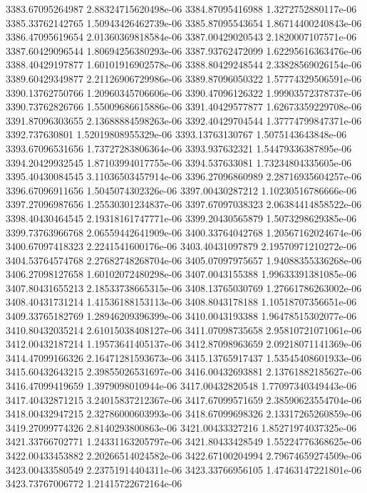 {3383.67095264987 2.88324715620498e-06
3384.87095416988 1.3272752880117e-06
3385.33762142765 1.50943426462739e-06
3385.87095543654 1.86714400240843e-06
3386.47095619654 2.01360369818584e-06
3387.00429020543 2.1820007107571e-06
3387.60429096544 1.80694256380293e-06
3387.93762472099 1.62295616363476e-06
3388.40429197877 1.60101916902578e-06
3388.80429248544 2.33828569026154e-06
3389.60429349877 2.21126906729986e-06
3389.87096050322 1.57774329506591e-06
3390.13762750766 1.20960345706606e-06
3390.47096126322 1.99903572378737e-06
3390.73762826766 1.55009686615886e-06
3391.40429577877 1.62673359229708e-06
3391.87096303655 2.13688884598263e-06
3392.40429704544 1.37774799847371e-06
3392.737630801 1.52019808955329e-06
3393.13763130767 1.5075143643848e-06
3393.67096531656 1.73727283806364e-06
3393.937632321 1.54479336387895e-06
3394.20429932545 1.87103994017755e-06
3394.537633081 1.73234804335605e-06
3395.40430084545 3.11036503457914e-06
3396.27096860989 2.28716935604257e-06
3396.67096911656 1.5045074302326e-06
3397.00430287212 1.10230516786666e-06
3397.27096987656 1.25530301234837e-06
3397.67097038323 2.06384414858522e-06
3398.40430464545 2.19318161747771e-06
3399.20430565879 1.5073298629385e-06
3399.73763966768 2.06559442641909e-06
3400.33764042768 1.20567162024674e-06
3400.67097418323 2.2241541600176e-06
3403.40431097879 2.19570971210272e-06
3404.53764574768 2.27682748268704e-06
3405.07097975657 1.94088355336268e-06
3406.27098127658 1.60102072480298e-06
3407.0043155388 1.99633391381085e-06
3407.80431655213 2.18533738665315e-06
3408.13765030769 1.27661786263002e-06
3408.40431731214 1.41536188153113e-06
3408.8043178188 1.10518707356651e-06
3409.33765182769 1.28946209396399e-06
3410.0043193388 1.96478515302077e-06
3410.80432035214 2.61015038408127e-06
3411.07098735658 2.95810721071061e-06
3412.00432187214 1.19573641405137e-06
3412.87098963659 2.09218071141369e-06
3414.47099166326 2.16471281593673e-06
3415.13765917437 1.53545408601933e-06
3415.60432643215 2.39855026531697e-06
3416.00432693881 2.13761882185627e-06
3416.47099419659 1.3979098010944e-06
3417.00432820548 1.77097340349443e-06
3417.40432871215 3.24015837212367e-06
3417.67099571659 2.38590623554704e-06
3418.00432947215 2.32786000603993e-06
3418.67099698326 2.13317265260859e-06
3419.27099774326 2.8140293800863e-06
3421.00433327216 1.85271974037325e-06
3421.33766702771 1.24331163205797e-06
3421.80433428549 1.55224776368625e-06
3422.00433453882 2.20266514024582e-06
3422.67100204994 2.79674659274509e-06
3423.00433580549 2.23751914404311e-06
3423.33766956105 1.47463147221801e-06
3423.73767006772 1.21415722672164e-06
}
